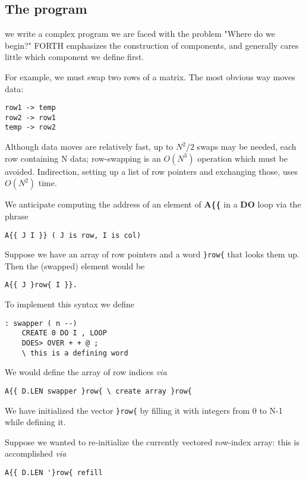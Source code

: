 \subsection{The program}
 we write a complex program we are faced with the
problem "Where do we begin?" FORTH emphasizes the construction of components,
and generally cares little which component
we define first.

For example, we must swap two rows of a matrix. The most
obvious way moves data:

\begin{verbatim}
row1 -> temp
row2 -> row1
temp -> row2
\end{verbatim}

Although data moves are relatively fast, up to $N^2/2$ swaps may be
needed, each row containing N data; row-swapping is an $O(N^3)$
operation which must be avoided. Indirection, setting up a list of
row pointers and exchanging those, uses $O(N^2)$ time.


We anticipate computing the address of an element of \textbf{A\{\{} in a
\textbf{DO} loop via the phrase 
\begin{verbatim}
A{{ J I }} ( J is row, I is col)
\end{verbatim}

Suppose we have an array of row pointers and a word \verb|}row{| that
looks them up. Then the (swapped) element would be
\begin{verbatim}
A{{ J }row{ I }}.
\end{verbatim}

To implement this syntax we define
\begin{verbatim}
: swapper ( n --)
    CREATE 0 DO I , LOOP
    DOES> OVER + + @ ;
    \ this is a defining word
\end{verbatim}
 
We would define the array of row indices \textit{via}

\begin{verbatim}
A{{ D.LEN swapper }row{ \ create array }row{
\end{verbatim}

We have initialized the vector \verb|}row{| by filling it with integers
from 0 to N-1 while defining it.

Suppose we wanted to re-initialize the currently vectored row-index array: this is accomplished \textit{via}

\begin{verbatim}
A{{ D.LEN '}row{ refill 
\end{verbatim}

